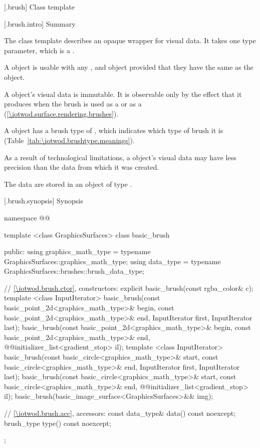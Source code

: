  [\iotwod.brush] {Class template }

 [\iotwod.brush.intro] {Summary}

\pnum
{}%
The class template  describes an opaque wrapper for visual data. It takes one type parameter, which is a \graphicssurfacestemplparamnospace.

\pnum
A  object is usable with any  , and  object provided that they have the same \graphicssurfacestemplparam as the  object.

\pnum
A  object's visual data is immutable. It is observable only by the effect that it produces when the brush is used as a  or as a  (\ref{\iotwod.surface.rendering.brushes}).

\pnum
A  object has a brush type of , which indicates which type of brush it is (Table~\ref{tab:\iotwod.brushtype.meanings}).

\pnum
As a result of technological limitations, a  object's visual data may have less precision than the data from which it was created.

\pnum
The data are stored in an object of type .

 [\iotwod.brush.synopsis] {Synopsis}

\begin{codeblock}
namespace @\fullnamespace{}@ {
  template <class GraphicsSurfaces>
  class basic_brush {
  public:
    using graphics_math_type = typename GraphicsSurfaces::graphics_math_type;
    using data_type = typename GraphicsSurfaces::brushes::brush_data_type;

    // \ref{\iotwod.brush.ctor}, constructors:
    explicit basic_brush(const rgba_color& c);
    template <class InputIterator>
    basic_brush(const basic_point_2d<graphics_math_type>& begin,
      const basic_point_2d<graphics_math_type>& end,
      InputIterator first, InputIterator last);
    basic_brush(const basic_point_2d<graphics_math_type>& begin,
      const basic_point_2d<graphics_math_type>& end,
      @\stdqualifier{}@initializer_list<gradient_stop> il);
    template <class InputIterator>
    basic_brush(const basic_circle<graphics_math_type>& start,
      const basic_circle<graphics_math_type>& end,
      InputIterator first, InputIterator last);
    basic_brush(const basic_circle<graphics_math_type>& start,
      const basic_circle<graphics_math_type>& end,
      @\stdqualifier{}@initializer_list<gradient_stop> il);
    basic_brush(basic_image_surface<GraphicsSurfaces>&& img);

	// \ref{\iotwod.brush.acc}, accessors:
    const data_type& data() const noexcept;
    brush_type type() const noexcept;
  };
}
\end{codeblock}

